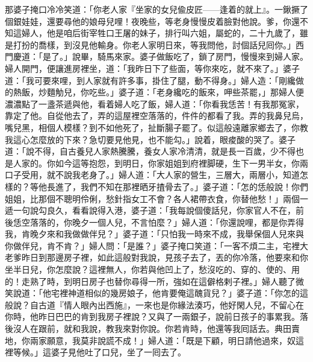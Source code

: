 那婆子掩口冷冷笑道：「你老人家『坐家的女兒偸皮匠——逢着的就上』。一鍬撅了個銀娃娃，還要尋他的娘母兒哩！夜晚些，等老身慢慢皮着臉對他說。爹，你還不知這婦人，他是咱后街宰牲口王屠的妹子，排行叫六姐，屬蛇的，二十九歲了，雖是打扮的喬樣，到沒見他輸身。{}你老人家明日來，等我問他，討個話兒囘你。」西門慶道：「是了。」說畢，騎馬來家。婆子做飯吃了，鎖了房門，慢慢來到婦人家。婦人開門，便讓進房裡坐，道：「我昨日下了些面，等你來吃，就不來了。」婆子道：「我可要來哩，到人家就有許多事，掛住了腿，動不得身。」婦人造：「剛纔做的熱飯，炒麵觔兒，你吃些。」{}婆子道：「老身纔吃的飯來，呷些茶罷，」那婦人便濃濃點了一盞茶遞與他，看着婦人吃了飯，婦人道：「你看我恁苦！有我那冤家，靠定了他。自從他去了，弄的這屋裡空落落的，件件的都看了我。弄的我鼻兒烏，嘴兒黑，相個人模樣？到不如他死了，扯斷腸子罷了。似這般遠離家鄉去了，你教我這心怎麼放的下來？急切要見他見，也不能勾。」{}說着，眼痠酸的哭了。婆子道：「說不得，自古養兒人家熱騰騰，養女人家冷清清，就是長一百歲，少不得也是人家的。你如今這等抱怨，到明日，你家姐姐到府裡脚硬，生下一男半女，你兩口子受用，就不說我老身了。」婦人道：「大人家的營生，三層大，兩層小，知道怎樣的？等他長進了，我們不知在那裡晒牙揸骨去了。」{}婆子道：「怎的恁般說！你們姐姐，比那個不聰明伶俐，愁針指女工不會？各人裙帶衣食，你替他愁！」兩個一遞一句說勾良久，看看說得入港，婆子道：「我每說個傻話兒，你家官人不在，前後恁空落落的，你晚夕一個人兒，不言怕麼？」婦人道：「你還說哩，都是你弄得我，肯晚夕來和我做做伴兒？」婆子道：「只怕我一時來不成，我舉保個人兒來與你做伴兒，肯不肯？」婦人問：「是誰？」婆子掩口笑道：「一客不煩二主，宅裡大老爹昨日到那邊房子裡，如此這般對我說，見孩子去了，丟的你冷落，他要來和你坐半日兒，你怎麼說？這裡無人，你若與他凹上了，愁沒吃的、穿的、使的、用的！走熟了時，到明日房子也替你尋得一所，強如在這僻格剌子裡。」婦人聽了微笑說道：「他宅裡神道相似的幾房娘子，他肯要俺這醜貨兒？」{}婆子道：「你怎的這般說？自古道『情人眼內出西施』，一來也是你緣法湊巧，他好閑人兒，不留心在你時，他昨日巴巴的肯到我房子裡說？又與了一兩銀子，說前日孩子的事累我。落後沒人在跟前，就和我說，教我來對你說。你若肯時，他還等我囘話去。典田賣地，你兩家願意，我莫非說謊不成！」婦人道：「既是下顧，明日請他過來，奴這裡等候。」這婆子見他吐了口兒，坐了一囘去了。

